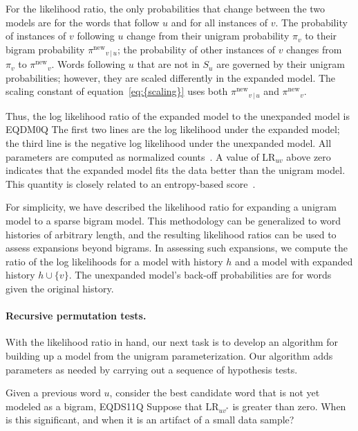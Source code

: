 \documentclass[11pt]{article}
\begin{document}
For the likelihood ratio, the only probabilities that change between
the two models are for the words that follow $u$ and for all instances
of $v$.  The probability of instances of $v$ following $u$ change from
their unigram probability $\pi_v$ to their bigram probability
${\pi^{\textrm{new}}}_{v {\,|\,} u}$; the probability of other instances of $v$ changes
from $\pi_v$ to ${\pi^{\textrm{new}}}_v$. Words following $u$ that are not in $S_u$
are governed by their unigram probabilities; however, they are scaled
differently in the expanded model. The scaling constant of
{equation~\eqref{eq:{scaling}}} uses both ${\pi^{\textrm{new}}}_{v {\,|\,} u}$ and ${\pi^{\textrm{new}}}_{v}$.

Thus, the log likelihood ratio of the expanded model to the unexpanded
model is
EQDM0Q
The first two lines are the log likelihood under the expanded model;
the third line is the negative log likelihood under the unexpanded
model.  All parameters are computed as normalized
counts~\citep{Katz:1987}.  A value of ${\textrm{LR}}_{uv}$ above zero indicates
that the expanded model fits the data better than the unigram model.
This quantity is closely related to an entropy-based
score~\cite{Stolcke:1998}.

For simplicity, we have described the likelihood ratio for expanding a
unigram model to a sparse bigram model.  This methodology can be
generalized to word histories of arbitrary length, and the resulting
likelihood ratios can be used to assess expansions beyond bigrams.  In
assessing such expansions, we compute the ratio of the log likelihoods
for a model with history ${h}$ and a model with expanded history
${h} \cup \{v\}$.  The unexpanded model's back-off probabilities are
for words given the original history.

\paragraph{Recursive permutation tests.}

With the likelihood ratio in hand, our next task is to develop an
algorithm for building up a model from the unigram parameterization.
Our algorithm adds parameters as needed by carrying out a sequence of
hypothesis tests.

Given a previous word $u$, consider the best candidate word that is
not yet modeled as a bigram,
EQDS11Q
Suppose that ${\textrm{LR}}_{uv^*}$ is greater than zero.  When is this
significant, and when it is an artifact of a small data sample?
\end{document}

